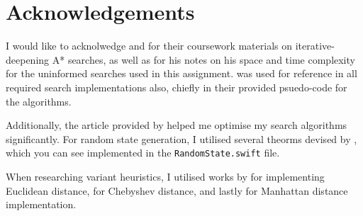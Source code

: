 \section*{Acknowledgements}
\label{sec:Acknowledgements}

I would like to acknolwedge \citet{rbruce1998} and \citet{amackworth1998} for
their coursework materials on iterative-deepening A* searches, as well as
\citet{canderson2012} for his notes on his space and time complexity for
the uninformed searches used in this assignment. \citet{aima2009} was used for
reference in all required search implementations also, chiefly in their provided
psuedo-code for the algorithms.

Additionally, the article provided by \citet{redblob2014} helped me optimise
my search algorithms significantly. For random state generation, I utilised
several theorms devised by \citet{gong2000}, which you can see implemented in
the \texttt{RandomState.swift} file.

When researching variant heuristics, I utilised works by \citet{deza2009} for
implementing Euclidean distance, \citet{cantrell2000modern} for Chebyshev
distance, and lastly \citet{krause2012taxicab} for Manhattan distance
implementation.
